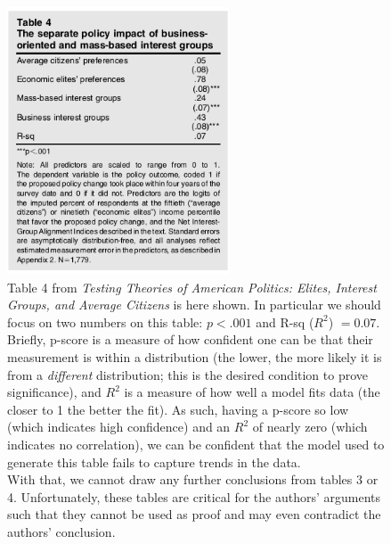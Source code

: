 \documentclass[]{article}
\begin{document}
\begin{figure}[H]
	\begin{center}
		\includegraphics[height=300px]{./figures/paper/economic-table4.png}
	\end{center}	
	\caption{Table 4 from \textit{Testing Theories of American Politics: Elites, Interest Groups, and Average Citizens} is here shown. In particular we should focus on two numbers on this table: $p < .001$ and R-sq ($R^2$) $= 0.07$. Briefly, p-score is a measure of how confident one can be that their measurement is within a distribution (the lower, the more likely it is from a \textit{different} distribution; this is the desired condition to prove significance), and $R^2$ is a measure of how well a model fits data (the closer to 1 the better the fit). As such, having a p-score so low (which indicates high confidence) and an $R^2$ of nearly zero (which indicates no correlation), we can be confident that the model used to generate this table fails to capture trends in the data. \\With that, we cannot draw any further conclusions from tables 3 or 4. Unfortunately, these tables are critical for the authors' arguments such that they cannot be used as proof and may even contradict the authors' conclusion.}
	\label{paper_table4}
\end{figure}
\end{document}
